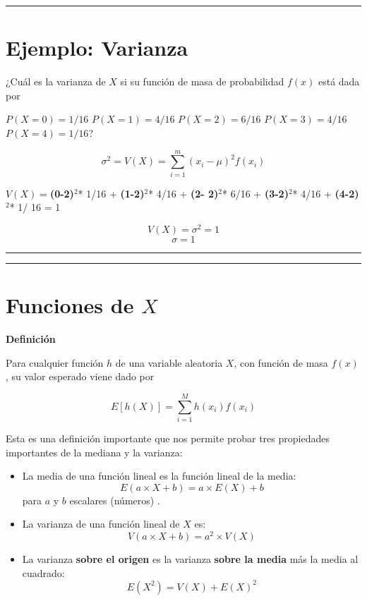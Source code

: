 \documentclass[
]{book}
\begin{document}
\begin{center}\rule{0.5\linewidth}{0.5pt}\end{center}

\hypertarget{ejemplo-varianza}{%
\section{Ejemplo: Varianza}\label{ejemplo-varianza}}

¿Cuál es la varianza de \(X\) si su función de masa de probabilidad \(f(x)\) está dada por

\(P(X=0)=1/16\)
\(P(X=1)=4/16\)
\(P(X=2)=6/16\)
\(P(X=3)=4/16\)
\(P(X=4)=1/16\)?

\[\sigma^2 =V(X)=\sum_{i=1}^m (x_i-\mu)^2 f(x_i)\]

\(V(X)=\)\textbf{(0-2)}\(^2\)* 1/16 + \textbf{(1-2)}\(^2\)* 4/16 + \textbf{(2- 2)}\(^2\)* 6/16 + \textbf{(3-2)}\(^2\)* 4/16 + \textbf{(4-2)}\(^2\)* 1/ 16 = 1

\[V(X)=\sigma^2=1\]
\[\sigma=1\]

\begin{center}\rule{0.5\linewidth}{0.5pt}\end{center}

\begin{center}\rule{0.5\linewidth}{0.5pt}\end{center}

\hypertarget{funciones-de-x}{%
\section{\texorpdfstring{Funciones de \(X\)}{Funciones de X}}\label{funciones-de-x}}

\textbf{Definición}

Para cualquier función \(h\) de una variable aleatoria \(X\), con función de masa \(f(x)\), su valor esperado viene dado por

\[ E[h(X)]= \sum_{i=1}^M h(x_i) f(x_i) \]

Esta es una definición importante que nos permite probar tres propiedades importantes de la mediana y la varianza:

\begin{itemize}
\item
  La media de una función lineal es la función lineal de la media: \[E(a\times X +b)= a\times E(X) +b\] para \(a\) y \(b\) escalares (números) .
\item
  La varianza de una función lineal de \(X\) es:\[V(a\times X +b)= a^2\times V(X)\]
\item
  La varianza \textbf{sobre el origen} es la varianza \textbf{sobre la media} más la media al cuadrado: \[E(X^2)=V(X)+E(X)^2\]
\end{itemize}
\end{document}
